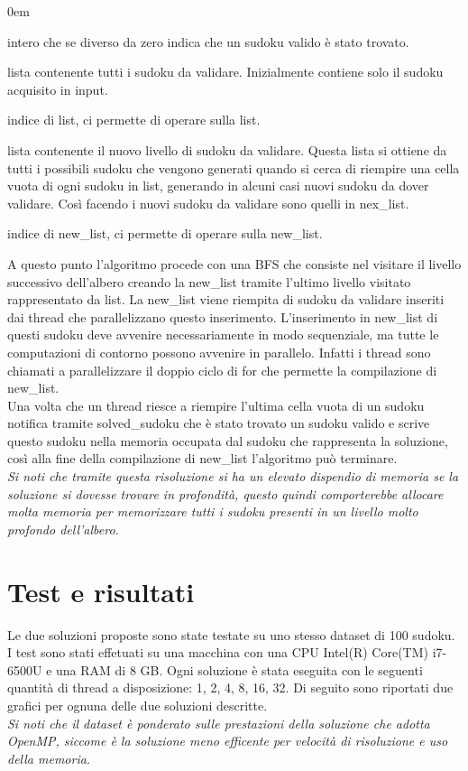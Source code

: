 \documentclass[twoside,twocolumn]{article}
\begin{document}
\begin{description}
	\addtolength{\itemindent}{0.5cm}
	\itemsep0em
	\item [solved\_sudoku] intero che se diverso da zero indica che un sudoku valido è stato trovato.
    \item [list] lista contenente tutti i sudoku da validare. Inizialmente contiene solo il sudoku acquisito in input.
    \item [index\_list] indice di list, ci permette di operare sulla list.
    \item [new\_list] lista contenente il nuovo livello di sudoku da validare. Questa lista si ottiene da tutti i possibili sudoku che vengono generati quando si cerca di riempire una cella vuota di ogni sudoku in list, generando in alcuni casi nuovi sudoku da dover validare. Così facendo i nuovi sudoku da validare sono quelli in nex\_list.
    \item [new\_index\_list] indice di new\_list, ci permette di operare sulla new\_list.
\end{description}

A questo punto l'algoritmo procede con una BFS che consiste nel visitare il livello successivo dell'albero creando la new\_list tramite l'ultimo livello visitato rappresentato da list. La new\_list viene riempita di sudoku da validare inseriti dai thread che parallelizzano questo inserimento. L'inserimento in new\_list di questi sudoku deve avvenire necessariamente in modo sequenziale, ma tutte le computazioni di contorno possono avvenire in parallelo. Infatti i thread sono chiamati a parallelizzare il doppio ciclo di for che permette la compilazione di new\_list. 
\\\indent
Una volta che un thread riesce a riempire l'ultima cella vuota di un sudoku notifica tramite solved\_sudoku che è stato trovato un sudoku valido e scrive questo sudoku nella memoria occupata dal sudoku che rappresenta la soluzione, così alla fine della compilazione di new\_list l'algoritmo può terminare.
\\\indent
{\itshape Si noti che tramite questa risoluzione si ha un elevato dispendio di memoria se la soluzione si dovesse trovare in profondità, questo quindi comporterebbe allocare molta memoria per memorizzare tutti i sudoku presenti in un livello molto profondo dell'albero.}

\section{Test e risultati} 	%
Le due soluzioni proposte sono state testate su uno stesso dataset di 100 sudoku. I test sono stati effetuati su una macchina con una CPU Intel(R) Core(TM) i7-6500U e una RAM di 8 GB. Ogni soluzione è stata eseguita con le seguenti quantità di thread a disposizione: 1, 2, 4, 8, 16, 32. Di seguito sono riportati due grafici per ognuna delle due soluzioni descritte. 
\\\indent
{\itshape Si noti che il dataset è ponderato sulle prestazioni della soluzione che adotta OpenMP, siccome è la soluzione meno efficente per velocità di risoluzione e uso della memoria.}
\end{document}
